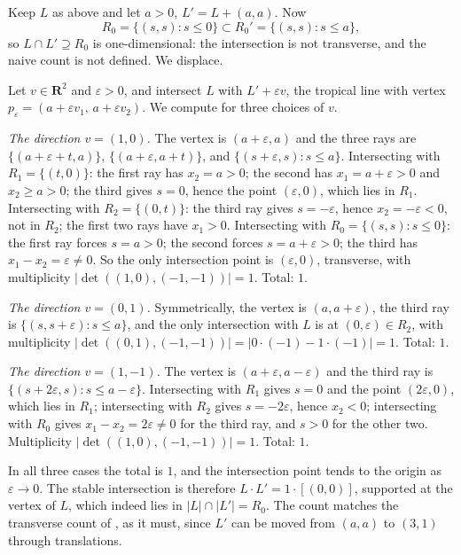 \begin{example}
\label{ex:ch10-two-lines-degenerate}
Keep $L$ as above and let $a>0$, $L'=L+(a,a)$.  Now
\[
 R_0=\{(s,s):s\leq0\}\subset R_0'=\{(s,s):s\leq a\},
\]
so $L\cap L'\supseteq R_0$ is one-dimensional: the intersection is not
transverse, and the naive count is not defined.  We displace.

Let $v\in\mathbf R^2$ and $\varepsilon>0$, and intersect $L$ with
$L'+\varepsilon v$, the tropical line with vertex
$p_\varepsilon=(a+\varepsilon v_1,\,a+\varepsilon v_2)$.  We compute for
three choices of $v$.

\emph{The direction $v=(1,0)$.}  The vertex is $(a+\varepsilon,a)$ and the
three rays are $\{(a+\varepsilon+t,a)\}$, $\{(a+\varepsilon,a+t)\}$, and
$\{(s+\varepsilon,s):s\leq a\}$.  Intersecting with $R_1=\{(t,0)\}$: the
first ray has $x_2=a>0$; the second has $x_1=a+\varepsilon>0$ and $x_2\geq
a>0$; the third gives $s=0$, hence the point $(\varepsilon,0)$, which lies in
$R_1$.  Intersecting with $R_2=\{(0,t)\}$: the third ray gives
$s=-\varepsilon$, hence $x_2=-\varepsilon<0$, not in $R_2$; the first two
rays have $x_1>0$.  Intersecting with $R_0=\{(s,s):s\leq0\}$: the first ray
forces $s=a>0$; the second forces $s=a+\varepsilon>0$; the third has
$x_1-x_2=\varepsilon\neq0$.  So the only intersection point is
$(\varepsilon,0)$, transverse, with multiplicity
$|\det((1,0),(-1,-1))|=1$.  Total: $1$.

\emph{The direction $v=(0,1)$.}  Symmetrically, the vertex is
$(a,a+\varepsilon)$, the third ray is $\{(s,s+\varepsilon):s\leq a\}$, and
the only intersection with $L$ is at $(0,\varepsilon)\in R_2$, with
multiplicity $|\det((0,1),(-1,-1))|=|0\cdot(-1)-1\cdot(-1)|=1$.  Total: $1$.

\emph{The direction $v=(1,-1)$.}  The vertex is
$(a+\varepsilon,a-\varepsilon)$ and the third ray is
$\{(s+2\varepsilon,s):s\leq a-\varepsilon\}$.  Intersecting with $R_1$ gives
$s=0$ and the point $(2\varepsilon,0)$, which lies in $R_1$; intersecting
with $R_2$ gives $s=-2\varepsilon$, hence $x_2<0$; intersecting with $R_0$
gives $x_1-x_2=2\varepsilon\neq0$ for the third ray, and $s>0$ for the other
two.  Multiplicity $|\det((1,0),(-1,-1))|=1$.  Total: $1$.

In all three cases the total is $1$, and the intersection point tends to the
origin as $\varepsilon\to0$.  The stable intersection is therefore
$L\cdot L'=1\cdot[(0,0)]$, supported at the vertex of $L$, which indeed lies
in $|L|\cap|L'|=R_0$.  The count matches the transverse count of
, as it must, since $L'$ can be moved from
$(a,a)$ to $(3,1)$ through translations.


\end{example}
